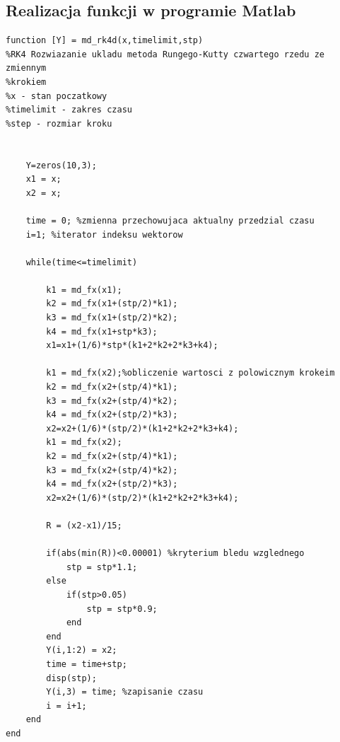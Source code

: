 \documentclass[a4paper, 12pt]{article}
\begin{document}
\subsection{Realizacja funkcji w programie Matlab}
\begin{lstlisting}
function [Y] = md_rk4d(x,timelimit,stp)
%RK4 Rozwiazanie ukladu metoda Rungego-Kutty czwartego rzedu ze zmiennym
%krokiem
%x - stan poczatkowy
%timelimit - zakres czasu
%step - rozmiar kroku

    
    Y=zeros(10,3);
    x1 = x;
    x2 = x;
    
    time = 0; %zmienna przechowujaca aktualny przedzial czasu
    i=1; %iterator indeksu wektorow

    while(time<=timelimit)
        
        k1 = md_fx(x1);
        k2 = md_fx(x1+(stp/2)*k1);
        k3 = md_fx(x1+(stp/2)*k2);
        k4 = md_fx(x1+stp*k3); 
        x1=x1+(1/6)*stp*(k1+2*k2+2*k3+k4);

        k1 = md_fx(x2);%obliczenie wartosci z polowicznym krokeim
        k2 = md_fx(x2+(stp/4)*k1);
        k3 = md_fx(x2+(stp/4)*k2);
        k4 = md_fx(x2+(stp/2)*k3);
        x2=x2+(1/6)*(stp/2)*(k1+2*k2+2*k3+k4);
        k1 = md_fx(x2);
        k2 = md_fx(x2+(stp/4)*k1);
        k3 = md_fx(x2+(stp/4)*k2);
        k4 = md_fx(x2+(stp/2)*k3);
        x2=x2+(1/6)*(stp/2)*(k1+2*k2+2*k3+k4);  
        
        R = (x2-x1)/15;
        
        if(abs(min(R))<0.00001) %kryterium bledu wzglednego  
            stp = stp*1.1;
        else
            if(stp>0.05)
                stp = stp*0.9;
            end
        end
        Y(i,1:2) = x2;
        time = time+stp; 
        disp(stp); 
        Y(i,3) = time; %zapisanie czasu
        i = i+1; 
    end
end

\end{lstlisting}
\end{document}

